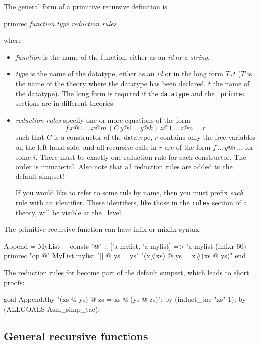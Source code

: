 The general form of a primitive recursive definition is
\begin{ttbox}
primrec {\it function} {\it type}
    {\it reduction rules}
\end{ttbox}
where
\begin{itemize}
\item \textit{function} is the name of the function, either as an \textit{id}
  or a \textit{string}.
\item \textit{type} is the name of the datatype, either as an \textit{id} or
  in the long form \texttt{$T$.$t$} ($T$ is the name of the theory
  where the datatype has been declared, $t$ the name of the datatype).
  The long form is required if the \texttt{datatype} and the {\tt
    primrec} sections are in different theories.
\item \textit{reduction rules} specify one or more equations of the form
  \[ f \, x@1 \, \dots \, x@m \, (C \, y@1 \, \dots \, y@k) \, z@1 \,
  \dots \, z@n = r \] such that $C$ is a constructor of the datatype,
  $r$ contains only the free variables on the left-hand side, and all
  recursive calls in $r$ are of the form $f \, \dots \, y@i \, \dots$
  for some $i$.  There must be exactly one reduction rule for each
  constructor.  The order is immaterial.  Also note that all reduction
  rules are added to the default simpset!
  
  If you would like to refer to some rule by name, then you must prefix
  \emph{each} rule with an identifier.  These identifiers, like those in the
  \texttt{rules} section of a theory, will be visible at the \ML\ level.
\end{itemize}

The primitive recursive function can have infix or mixfix syntax:
\begin{ttbox}\underscoreon
Append = MyList +
consts "@"  :: ['a mylist, 'a mylist] => 'a mylist  (infixr 60)
primrec "op @" MyList.mylist
   "[] @ ys = ys"
   "(x#xs) @ ys = x#(xs @ ys)"
end
\end{ttbox}

The reduction rules for {\tt\at} become part of the default simpset, which
leads to short proofs:
\begin{ttbox}\underscoreon
goal Append.thy "(xs @ ys) @ zs = xs @ (ys @ zs)";
by (induct\_tac "xs" 1);
by (ALLGOALS Asm\_simp\_tac);
\end{ttbox}



\subsection{General recursive functions}
\label{sec:HOL:recdef}

